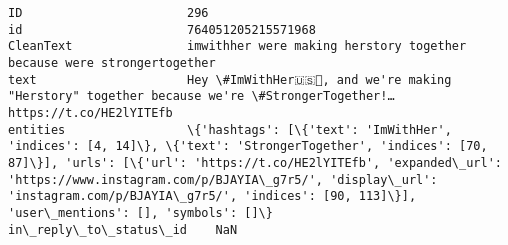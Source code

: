 \documentclass[11pt]{article}
\begin{document}
    \begin{Verbatim}[commandchars=\\\{\}]
ID                       296                                                                                                                                                                                                                                                                                                                                                                                             
id                       764051205215571968                                                                                                                                                                                                                                                                                                                                                                              
CleanText                imwithher were making herstory together because were strongertogether                                                                                                                                                                                                                                                                                                                           
text                     Hey \#ImWithHer🇺🇸👠, and we're making "Herstory" together because we're \#StrongerTogether!… https://t.co/HE2lYITEfb                                                                                                                                                                                                                                                                               
entities                 \{'hashtags': [\{'text': 'ImWithHer', 'indices': [4, 14]\}, \{'text': 'StrongerTogether', 'indices': [70, 87]\}], 'urls': [\{'url': 'https://t.co/HE2lYITEfb', 'expanded\_url': 'https://www.instagram.com/p/BJAYIA\_g7r5/', 'display\_url': 'instagram.com/p/BJAYIA\_g7r5/', 'indices': [90, 113]\}], 'user\_mentions': [], 'symbols': []\}                                                                 
in\_reply\_to\_status\_id    NaN                                                                                                                                                                                                                                                                                                                                                                                             

\end{Verbatim}
\end{document}
